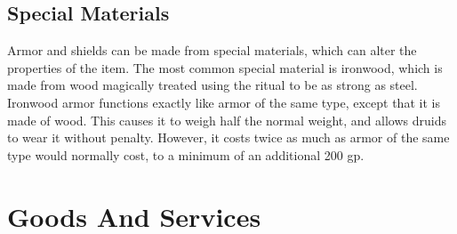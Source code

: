 \subsection{Special Materials}
Armor and shields can be made from special materials, which can alter the properties of the item. The most common special material is ironwood, which is made from wood magically treated using the  ritual to be as strong as steel. Ironwood armor functions exactly like  armor of the same type, except that it is made of wood. This causes it to weigh half the normal weight, and allows druids to wear it without penalty. However, it costs twice as much as armor of the same type would normally cost, to a minimum of an additional 200 gp.

\section{Goods And Services}

